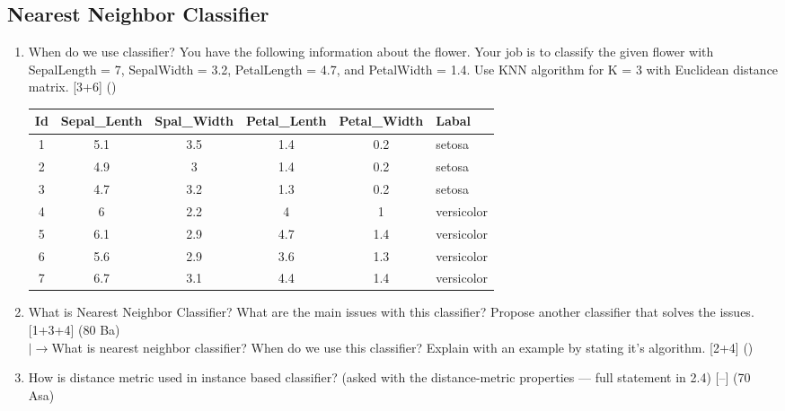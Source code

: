 \documentclass[12pt]{article}
\newcommand{\lb}{\\$\left|\rightarrow\right.$}
\begin{document}
  \subsection{Nearest Neighbor Classifier}
    \begin{enumerate}[topsep=0pt, noitemsep]
      \item When do we use classifier? You have the following information about the flower. Your job is to classify the given flower with SepalLength = 7, SepalWidth = 3.2, PetalLength = 4.7, and PetalWidth = 1.4. Use KNN algorithm for K = 3 with Euclidean distance matrix. \hfill [3+6] ()\\
        \small
        \begin{tabular}{|c|c|c|c|c|l|}
          \hline
          Id & Sepal\_Lenth & Spal\_Width & Petal\_Lenth & Petal\_Width & Labal \\ \hline
          1 & 5.1 & 3.5 & 1.4 & 0.2 & setosa \\ \hline
          2 & 4.9 & 3 & 1.4 & 0.2 & setosa \\ \hline
          3 & 4.7 & 3.2 & 1.3 & 0.2 & setosa \\ \hline
          4 & 6 & 2.2 & 4 & 1 & versicolor \\ \hline
          5 & 6.1 & 2.9 & 4.7 & 1.4 & versicolor \\ \hline
          6 & 5.6 & 2.9 & 3.6 & 1.3 & versicolor \\ \hline
          7 & 6.7 & 3.1 & 4.4 & 1.4 & versicolor \\ \hline
        \end{tabular}
        \normalsize

      \item What is Nearest Neighbor Classifier? What are the main issues with this classifier? Propose another classifier that solves the issues. \hfill [1+3+4] (80 Ba)
        \lb What is nearest neighbor classifier? When do we use this classifier? Explain with an example by stating it's algorithm. \hfill [2+4] ()

      \item How is distance metric used in instance based classifier? (asked with the distance-metric properties --- full statement in 2.4) \hfill [--] (70 Asa)
    \end{enumerate}
\end{document}
